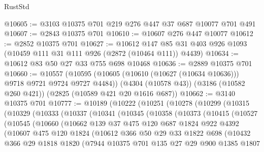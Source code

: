 \begin{lexlean}{RustStd}
\begin{coremodule}
{\begin{coremodule}
{{{{{{{{{{{{{{{{{{{{@10605 := @3103 @10375 @701 @219 @276 @447 @37 @687 @10077 @701 @491
@10607 := @2843 @10375 @701
@10610 := @10607 @276 @447 @10077
@10612 := @2852 @10375 @701
@10627 := @10612
    @147
    @85
    @31
    @403
    @926
    @1093
    (@10459 @111 @31 @111 @926 (@2872 (@10464 @111)) @4439)
@10634 := @10612 @83 @50 @27 @33 @755 @698 @10468
@10636 := @2889 @10375 @701
@10660 := @10557
    (@10595 (@10605 (@10610 (@10627 (@10634 @10636))) @9718 @9721 @9724 @9727 @4484))
    (@4304 (@10578 @43))
    (@3186 (@10582 @260 @421))
    (@2825 (@10589 @421 @20 @1616 @687))
@10662 := @3140 @10375 @701
@10777 := @10189
    (@10222
      (@10251
        (@10278
          (@10299
            (@10315
              (@10329
                (@10333
                  (@10337
                    (@10341
                      (@10345
                        (@10358
                          (@10373
                            (@10415
                              (@10527
                                (@10545
                                  (@10660
                                    (@10662
                                      @139
                                      @37
                                      @475
                                      @120
                                      @687
                                      @1824
                                      @922
                                      @4392
                                      (@10607
                                        @475
                                        @120
                                        @1824
                                        (@10612
                                          @366
                                          @50
                                          @29
                                          @33
                                          @1822
                                          @698
                                          (@10432
                                            @366
                                            @29
                                            @1818
                                            @1820
                                            (@7944
                                              @10375
                                              @701
                                              @135
                                              @27
                                              @29
                                              @900
                                              @1385
                                              @1807
}}}}}}}}}}}}}}}}}}}}
\end{coremodule}}
\end{coremodule}
\end{lexlean}
